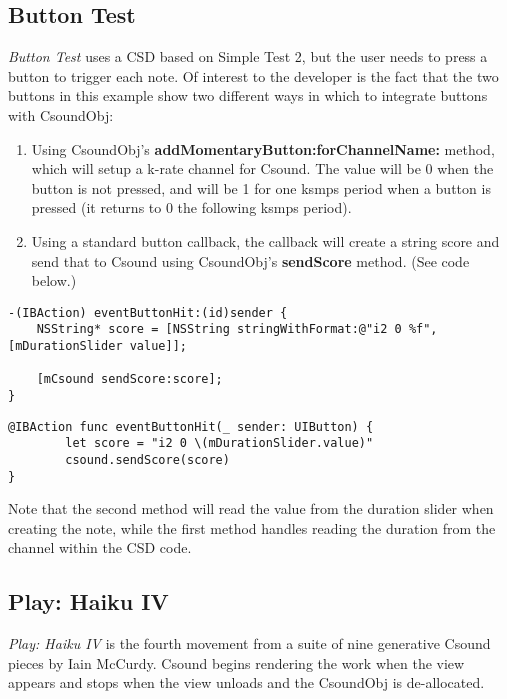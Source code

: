 \documentclass[11pt]{article}
\begin{document}
\subsection{Button Test}

\emph{Button Test} uses a CSD based on Simple Test 2, but the user needs to press a button to trigger each note.  Of interest to the developer is the fact that the two buttons in this example show two different ways in which to integrate buttons with CsoundObj:

\begin{enumerate}
\item Using CsoundObj's \textbf{addMomentaryButton:forChannelName:} method, which will setup a k-rate channel for Csound.  The value will be 0 when the button is not pressed, and will be 1 for one ksmps period when a button is pressed (it returns to 0 the following ksmps period).
\item Using a standard button callback, the callback will create a string score and send that to Csound using CsoundObj's \textbf{sendScore} method. (See code below.)
\end{enumerate}

\begin{lstlisting}[caption=Example code showing sending score text to CsoundObj]
-(IBAction) eventButtonHit:(id)sender {
    NSString* score = [NSString stringWithFormat:@"i2 0 %f", [mDurationSlider value]];

    [mCsound sendScore:score];
}
\end{lstlisting}

\begin{lstlisting}[caption=Equivalent example in Swift 3]
@IBAction func eventButtonHit(_ sender: UIButton) {
        let score = "i2 0 \(mDurationSlider.value)"
        csound.sendScore(score)
}
\end{lstlisting}

Note that the second method will read the value from the duration slider when creating the note, while the first method handles reading the duration from the channel within the CSD code.

\subsection{Play: Haiku IV}

\emph{Play: Haiku IV} is the fourth movement from a suite of nine generative Csound pieces by Iain McCurdy. Csound begins rendering the work when the view appears and stops when the view unloads and the CsoundObj is de-allocated.   
\end{document}
